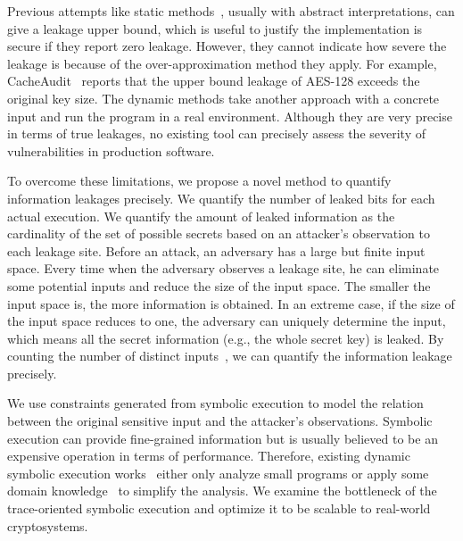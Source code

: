 Previous attempts like static methods~\cite{182946,5207642}, usually with
abstract interpretations, can give a leakage upper bound, which is useful to
justify the implementation is secure if they report zero leakage.
However, they cannot indicate how severe the leakage is because of the
over-approximation method they apply. For example, CacheAudit~\cite{182946} 
reports that the upper
bound leakage of AES-128 exceeds the original key size. The dynamic methods take
another approach with a concrete input and run the program in a real
environment. Although they are very precise in terms of true leakages, no
existing tool can precisely assess the severity of vulnerabilities in production
software. 

To overcome these limitations, we propose a novel method to quantify information 
leakages precisely. We quantify the number of leaked bits for each actual execution.
We quantify the amount of leaked information as the cardinality of the set of possible
secrets based on an attacker's observation to each leakage site.
Before an attack, an adversary has a large but finite input space. Every time
when the adversary observes a leakage site, he can eliminate some potential
inputs and reduce the size of the input space. The smaller the input space is,
the more information is obtained. In an extreme case, if the size of the
input space reduces to one, the adversary can uniquely determine the input, 
which means all the secret information (e.g., the whole secret key) is
leaked. By counting the number of distinct inputs~\cite{10.1007/11499107_24}, 
we can quantify the information leakage precisely.

We use constraints generated from symbolic execution to model the relation 
between the original sensitive input and the attacker's observations. 
Symbolic execution can provide fine-grained information but is usually believed to be an expensive
operation in terms of performance. Therefore, existing dynamic symbolic
execution works~\cite{203878,236338,Brotzman19Casym} either only analyze
small programs or apply some domain knowledge~\cite{203878} to simplify the analysis. We
examine the bottleneck of the trace-oriented symbolic execution and optimize it
to be scalable to real-world cryptosystems.

